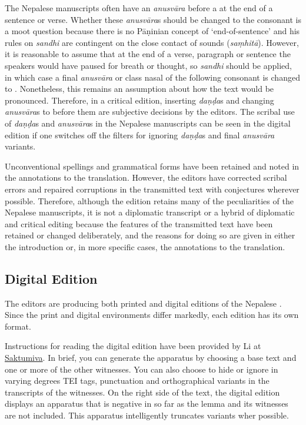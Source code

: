 The Nepalese manuscripts often have an \emph{anusvāra} before a 
 at the end of a sentence or verse. Whether these 
\emph{anusvāra}s should be changed to the consonant  is a moot 
question because there is no Pāṇinian concept of `end-of-sentence' and his rules 
on \emph{sandhi} are contingent on the close contact of  sounds 
(\emph{saṃhitā}). However, it is reasonable to assume that at the end 
of a verse, paragraph or sentence the speakers would have paused for breath or 
thought, so \emph{sandhi} should be applied, in which case a final 
\emph{anusvāra} or class nasal of the following consonant is changed to 
.  Nonetheless, this remains an assumption about how the text would 
be pronounced. Therefore, in a critical edition, inserting \emph{daṇḍa}s and 
changing \emph{anusvāra}s to  before them are subjective decisions 
by the editors. The scribal use of \emph{daṇḍa}s and \emph{anusvāra}s in the 
Nepalese manuscripts can be seen in the digital edition if one switches off the 
filters for ignoring \emph{daṇḍa}s and final \emph{anusvāra} variants. 

Unconventional spellings and grammatical forms have been retained and noted in 
the annotations to the translation. However, the editors have corrected scribal 
errors and repaired corruptions in the transmitted text with conjectures wherever 
possible. Therefore, although the edition retains many of the peculiarities of the 
Nepalese manuscripts, it is not a diplomatic transcript or a hybrid of diplomatic 
and critical editing because the features of the transmitted text have been 
retained or changed deliberately, and the reasons for doing so are given in either 
the introduction or, in more specific cases, the annotations to the translation.

\subsection{Digital Edition}
The editors are producing both printed and digital editions of the Nepalese 
\SS. Since the print and digital environments differ markedly, each edition has 
its own format. 

Instructions for reading the digital edition have been provided by  Li at 
\href{https://saktumiva.org/wiki/users}{Saktumiva}. In brief, you can 
generate the apparatus by choosing a base text and one or more of the other 
witnesses. You can also choose to hide or ignore in varying degrees TEI 
tags, punctuation and orthographical variants in the transcripts of the witnesses. 
On the right side of the text, the digital edition displays an apparatus that is 
negative in so far as the lemma and its witnesses are not included. This apparatus 
intelligently truncates variants wher possible. 

